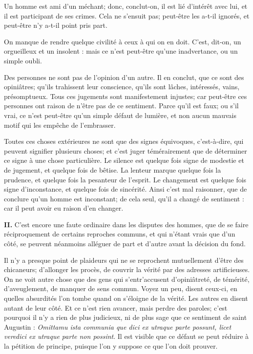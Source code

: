 Un homme est ami d'un méchant; donc, conclut-on, il est lié d'intérêt avec lui, et il est participant de ses crimes. Cela ne s'ensuit pas; peut-être les a-t-il ignorés, et peut-être n'y a-t-il point pris part.

On manque de rendre quelque civilité à ceux à qui on en doit. C'est, dit-on, un orgueilleux et un insolent : mais ce n'est peut-être qu'une inadvertance, ou un simple oubli.

Des personnes ne sont pas de l'opinion d'un autre. Il en conclut, que ce sont des opiniâtres; qu'ils trahissent leur conscience, qu'ils sont lâches, intéressés, vains, présomptueux. Tous ces jugements sont manifestement injustes; car peut-être ces personnes ont raison de n'être pas de ce sentiment. Parce qu'il est faux; ou s'il vrai, ce n'est peut-être qu'un simple défaut de lumière, et non aucun mauvais motif qui les empêche de l'embrasser.

Toutes ces choses extérieures ne sont que des signes équivoques, c'est-à-dire, qui peuvent signifier plusieurs choses; et c'est juger témérairement que de déterminer ce signe à une chose particulière. Le silence est quelque fois signe de modestie et de jugement, et quelque fois de bêtise. La lenteur marque quelque fois la prudence, et quelque fois la pesanteur de l'esprit. Le changement est quelque fois signe d'inconstance, et quelque fois de sincérité. Ainsi c'est mal raisonner, que de conclure qu'un homme est inconstant; de cela seul, qu'il a changé de sentiment : car il peut avoir eu raison d'en changer.

\bigbreak
{\bfseries\scshape II.} C'est encore une faute ordinaire dans les disputes des hommes, que de se faire réciproquement de certains reproches communs, et qui n'étant vrais que d'un côté, se peuvent néanmoins alléguer de part et d'autre avant la décision du fond.

Il n'y a presque point de plaideurs qui ne se reprochent mutuellement d'être des chicaneurs; d'allonger les procès, de couvrir la vérité par des adresses artificieuses. On ne voit autre chose que des gens qui s'entr'accusent d'opiniâtreté, de témérité, d'aveuglement, de manquer de sens commun. Voyez un peu, disent ceux-ci, en quelles absurdités l'on tombe quand on s'éloigne de la vérité. Les autres en disent autant de leur côté. Et ce n'est rien avancer, mais perdre des paroles; c'est pourquoi il n'y a rien de plus judicieux, ni de plus sage que ce sentiment de saint Augustin : \emph{Omittamu ista communia que dici ex utraque parte possunt, licet veredici ex utraque parte non possint}. Il est visible que ce défaut se peut réduire à la pétition de principe, puisque l'on y suppose ce que l'on doit prouver.

